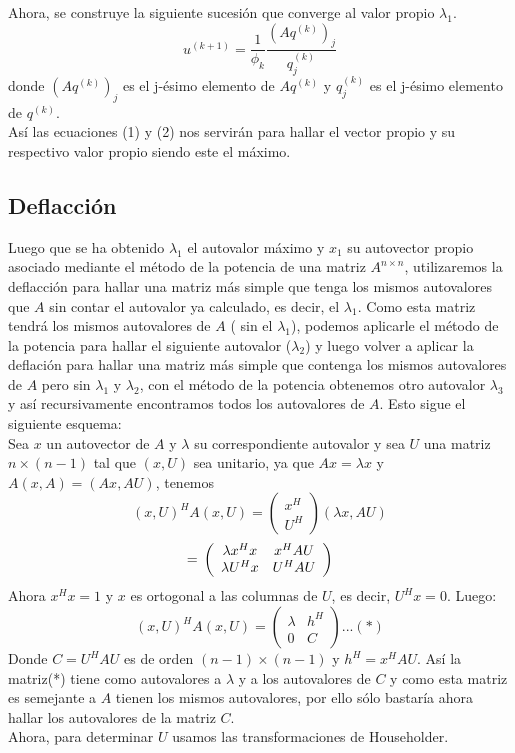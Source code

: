 \documentclass[12pt,a4paper]{article}
\begin{document}
\begin{multicols}{2}
Ahora, se construye la siguiente sucesión que converge al valor propio $\lambda_{1}$.
\begin{equation}\label{eigenvalue_iter}
u^{(k+1)} = \frac{1}{\phi_{k}}\frac{(Aq^{(k)})_{j}}{q^{(k)}_{j}}
\end{equation}
donde $(Aq^{(k)})_{j}$ es el j-ésimo elemento de $Aq^{(k)}$ y $q^{(k)}_{j}$ es el j-ésimo elemento de $q^{(k)}.$\\
Así las ecuaciones (1) y (2) nos servirán para hallar el vector propio y su respectivo valor propio siendo este el máximo.


\subsection{Deflacción}
\noindent Luego que se ha obtenido $\lambda_{1}$ el autovalor máximo y $x_{1}$ su autovector propio asociado mediante el método de la potencia de una matriz $A^{n\times n}$, utilizaremos la deflacción para hallar una matriz más simple que tenga los mismos autovalores que $A$ sin contar el autovalor ya calculado, es decir, el $\lambda_{1}$. Como esta matriz tendrá los mismos autovalores de $A$ ( sin el $\lambda_{1}$), podemos aplicarle el método de la potencia para hallar el siguiente autovalor ($\lambda_{2}$) y luego volver a aplicar la deflación para hallar una matriz más simple que contenga los mismos autovalores de $A$ pero sin $\lambda_{1}$ y $\lambda_{2}$, con el método de la potencia obtenemos otro autovalor $\lambda_{3}$ y así recursivamente encontramos todos los autovalores de $A$.
Esto sigue el siguiente esquema:\\
Sea $x$ un autovector de $A$ y $\lambda $ su correspondiente autovalor y sea $U$ una matriz $n\times(n-1)$ tal que $(x,U)$ sea unitario, ya que $Ax=\lambda x$ y $A(x,A)=(Ax,AU)$, tenemos$$(x,U)^{H}A(x,U)=\left(\begin{array}{c}
    x^{H} \\
     U^{H} 
\end{array}\right)\left(\lambda x,AU\right)$$ $$=\newline \left(\begin{array}{cc}
   \lambda x^{H}x  &  x^{H}AU\\
   \lambda U^{H}x  & U^{H}AU
\end{array}\right)$$
Ahora $x^{H}x=1$  y $x$ es ortogonal a las columnas de $U$, es decir, $U^{H}x=0$. Luego:\\
$$(x,U)^{H}A(x,U)=\left(\begin{array}{cc}
  \lambda   &  h^{H}\\
    0 & C
\end{array}\right)...(*)$$ Donde $C=U^{H}AU$ es de orden  $(n-1)\times (n-1)$ y $h^{H}=x^{H}AU$. Así la matriz(*) tiene como autovalores a $\lambda$ y a los autovalores de $C$ y como esta matriz es semejante a $A$ tienen los mismos autovalores, por ello sólo bastaría ahora hallar los autovalores de la matriz $C$.\\
Ahora, para determinar $U$ usamos las transformaciones de Householder.\\


\end{multicols}
\end{document}
